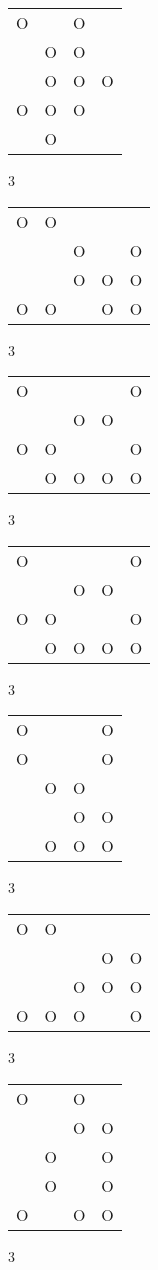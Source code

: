 \begin{tabular}{|m{0.2cm}m{0.2cm}m{0.2cm}m{0.2cm}|}\hline
O& &O& \\
 &O&O& \\
 &O&O&O\\
O&O&O& \\
 &O& & \\
\hline\end{tabular}3
\begin{tabular}{|m{0.2cm}m{0.2cm}m{0.2cm}m{0.2cm}m{0.2cm}|}\hline
O&O& & & \\
 & &O& &O\\
 & &O&O&O\\
O&O& &O&O\\
\hline\end{tabular}3
\begin{tabular}{|m{0.2cm}m{0.2cm}m{0.2cm}m{0.2cm}m{0.2cm}|}\hline
O& & & &O\\
 & &O&O& \\
O&O& & &O\\
 &O&O&O&O\\
\hline\end{tabular}3
\begin{tabular}{|m{0.2cm}m{0.2cm}m{0.2cm}m{0.2cm}m{0.2cm}|}\hline
O& & & &O\\
 & &O&O& \\
O&O& & &O\\
 &O&O&O&O\\
\hline\end{tabular}3
\begin{tabular}{|m{0.2cm}m{0.2cm}m{0.2cm}m{0.2cm}|}\hline
O& & &O\\
O& & &O\\
 &O&O& \\
 & &O&O\\
 &O&O&O\\
\hline\end{tabular}3
\begin{tabular}{|m{0.2cm}m{0.2cm}m{0.2cm}m{0.2cm}m{0.2cm}|}\hline
O&O& & & \\
 & & &O&O\\
 & &O&O&O\\
O&O&O& &O\\
\hline\end{tabular}3
\begin{tabular}{|m{0.2cm}m{0.2cm}m{0.2cm}m{0.2cm}|}\hline
O& &O& \\
 & &O&O\\
 &O& &O\\
 &O& &O\\
O& &O&O\\
\hline\end{tabular}3
